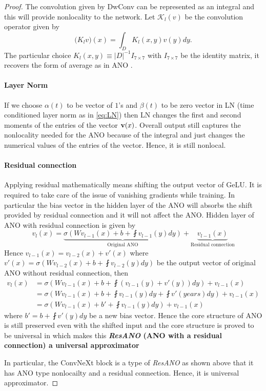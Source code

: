 \documentclass[reqno,10pt]{amsart}
\theoremstyle{plain}
\theoremstyle{definition}
\newcommand{\cal}[1]{\mathcal{#1}}
\begin{document}
\begin{proof}
    The convolution given by DwConv can be represented as an integral and this will provide nonlocality to the network. Let $\cal K_l(v)$ be the convolution operator given by
    $$\cal (K_lv)(x) = \int_{D} K_l(x,y) v(y) dy.$$
    The particular choice $K_l(x,y) \equiv |D|^{-1} I_{7\times 7}$ with $I_{7\times 7}$ be the identity matrix, it recovers the form of average as in ANO \cite{SL2024}. 
    \paragraph{\bf Layer Norm}\label{par:LN} If we choose $\alpha(t)$ to be vector of $1$'s and $\beta(t)$ to be zero vector in LN (time conditioned layer norm as in \ref{eq:LN}) then LN changes the first and second moments of the entries of the vector ${\bf v}(x)$. Overall output still captures the nonlocality needed for the ANO because of the integral and just changes the numerical values of the entries of the vector. Hence, it is still nonlocal.
    \paragraph{\bf Residual connection} \label{par:resano} Applying residual mathematically means shifting the output vector of GeLU. It is required to take care of the issue of vanishing gradients while training. In particular the bias vector in the hidden layer of the ANO will absorbs the shift provided by residual connection and it will not affect the ANO. Hidden layer of ANO with residual connection is given by
    $$ v_l(x) = \underbrace{\sigma\left(Wv_{l-1}(x) + b + \fint v_{l-1}(y)dy\right)}_{\text{Original ANO}} + \underbrace{v_{l-1}(x)}_{\text{Residual connection}} $$
    Hence $v_{l-1}(x) = v_{l-2}(x) + v'(x)$ where $v'(x) = \sigma\left(Wv_{l-2}(x) + b + \fint v_{l-2}(y)dy\right) $ be the output vector of original ANO without residual connection, then
    \begin{equation*}
        \begin{aligned}
            v_l(x) &= \sigma\left(Wv_{l-1}(x) + b + \fint (v_{l-1}(y) + v'(y))dy\right) + v_{l-1}(x) \\
            &= \sigma\left(Wv_{l-1}(x) + b + \fint v_{l-1}(y) dy + \fint v'(years) dy\right) + v_{l-1}(x) \\
            &= \sigma\left(Wv_{l-1}(x) + b' + \fint v_{l-1}(y) dy \right) + v_{l-1}(x)
        \end{aligned}
    \end{equation*}
    where $b' = b + \fint v'(y)dy$ be a new bias vector. Hence the core structure of ANO is still preserved even with the shifted input and the core structure is proved to be universal in \cite{SL2024} which makes this {\bf {\it ResANO} (ANO with a residual connection) a universal approximator}

    \noindent In particular, the ConvNeXt block is a type of {\it ResANO} as shown above that it has ANO type nonlocailty and a residual connection. Hence, it is universal approximator.
\end{proof}
\end{document}
